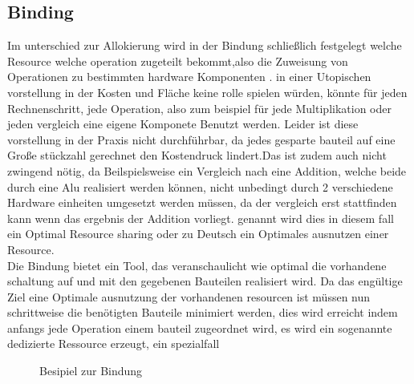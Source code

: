 \documentclass[conference]{IEEEtran}
\begin{document}
\subsection{Binding}
Im unterschied zur Allokierung wird in der Bindung schließlich festgelegt welche Resource welche operation zugeteilt bekommt,also die Zuweisung von Operationen zu bestimmten hardware Komponenten \cite{3}. in einer Utopischen vorstellung in der Kosten und Fläche keine rolle spielen würden, könnte für jeden Rechnenschritt, jede Operation, also zum beispiel für jede Multiplikation oder jeden vergleich eine eigene Komponete Benutzt werden. Leider ist diese vorstellung in der Praxis nicht durchführbar,  da jedes gesparte bauteil auf eine Große stückzahl gerechnet den Kostendruck lindert.Das ist zudem auch nicht zwingend nötig, da Beilspielsweise ein Vergleich nach eine Addition, welche beide durch eine Alu realisiert werden können, nicht unbedingt durch 2 verschiedene Hardware einheiten umgesetzt werden müssen, da der vergleich erst stattfinden kann wenn das ergebnis der Addition vorliegt. genannt wird dies in diesem fall ein Optimal Resource sharing oder zu Deutsch ein Optimales ausnutzen einer Resource\cite{2}.\\
Die Bindung bietet ein Tool, das veranschaulicht wie optimal die vorhandene schaltung auf und mit den gegebenen Bauteilen realisiert wird. Da das engültige Ziel eine Optimale ausnutzung der vorhandenen resourcen ist müssen nun schrittweise die benötigten Bauteile minimiert werden, dies wird erreicht indem anfangs jede Operation einem bauteil zugeordnet wird, es wird ein sogenannte dedizierte Ressource erzeugt, ein spezialfall \cite[S. 150]{3} 
\begin{figure}[h]
\caption{Besipiel zur Bindung}
\label{fig.1}
\end{figure} 
\end{document}
